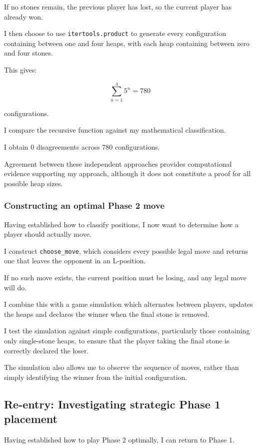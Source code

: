 \documentclass[11pt]{article}
\newcommand{\keywordfont}{\textsc}
\newcommand{\keyword}[1]{%
  \marginpar{\raggedright\small\keywordfont{#1}}}
\begin{document}
If no stones remain, the previous player has lost, so the current player has already won.

I then choose to use \texttt{itertools.product} to generate every configuration containing between one and four heaps, with each heap containing between zero and four stones.

This gives:

\[
\sum_{n=1}^{4}5^n=780
\]

configurations.

I compare the recursive function against my mathematical classification.

I obtain 0 disagreements \keyword{Check} across 780 configurations.

Agreement between these independent approaches provides computational evidence supporting my approach, although it does not constitute a proof for all possible heap sizes.

\subsubsection{Constructing an optimal Phase 2 move}

Having established how to classify positions, I now want to determine how a player should actually move.

I construct \texttt{choose\_move}, which considers every possible legal move and returns one that leaves the opponent in an L-position.

If no such move exists, the current position must be losing, and any legal move will do.

I combine this with a game simulation which alternates between players, updates the heaps and declares the winner when the final stone is removed.

I test the simulation against
\keyword{Check} simple configurations, particularly those containing only single-stone heaps, to ensure that the player taking the final stone is correctly declared the loser.

The simulation also allows me to observe the sequence of moves, rather than simply identifying the winner from the initial configuration. 

\subsection{Re-entry: Investigating strategic Phase 1 placement}

Having established how to play Phase 2 optimally, I can return to Phase 1.
\end{document}
